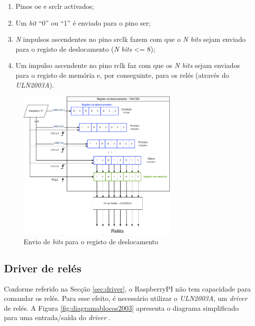 \begin{enumerate}
	\item Pinos \acrshort{oe} e \acrshort{srclr} activados;
	\item Um \textit{bit} ``0'' ou ``1'' é enviado para o pino \acrshort{ser};
	\item \textit{N} impulsos ascendentes no pino \acrshort{srclk} fazem com que o \textit{N bits} sejam enviado para o registo de deslocamento (\textit{N bits} <= 8);
	\item Um impulso ascendente no pino \acrshort{rclk} faz com que os \textit{N bits} sejam enviados para o registo de memória e, por conseguinte, para os relés (através do \textit{ULN2003A}).
\end{enumerate}


\begin{figure}[hbtp]
	\centering
	\includegraphics[width=0.7\textwidth]{figures/registo deslocamente.drawio.png}
	\caption{Envio de \textit{bits} para o registo de deslocamento}
	\label{fig:esquematico74hc595}
\end{figure}

\subsection{Driver de relés}
\label{sec:driverreles}
Conforme referido na Secção \ref{sec:driver}, o \gls{RaspberryPI} não tem capacidade para comandar os relés. Para esse efeito, é necessário utilizar o \textit{ULN2003A}, um \textit{driver} de relés. A Figura \ref{fig:diagramablocos2003} apresenta o diagrama simplificado para uma entrada/saída do \textit{driver} \cite{ULN2003}.

